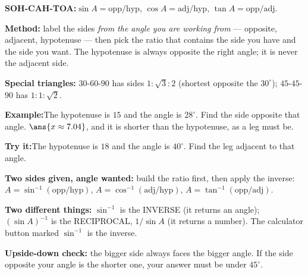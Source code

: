 \documentclass[12pt]{article}
\begin{document}


\begin{formulabox}
\textbf{SOH-CAH-TOA:}\quad $\sin A = \text{opp}/\text{hyp}$, \quad
$\cos A = \text{adj}/\text{hyp}$, \quad $\tan A = \text{opp}/\text{adj}$.\par
\smallskip
\textbf{Method:} label the sides \emph{from the angle you are working from} ---
opposite, adjacent, hypotenuse --- then pick the ratio that contains the side
you have and the side you want. The hypotenuse is always opposite the right
angle; it is never the adjacent side.\par
\smallskip
\textbf{Special triangles:} $30$-$60$-$90$ has sides $1 : \sqrt{3} : 2$
(shortest opposite the $30^\circ$); $45$-$45$-$90$ has $1 : 1 : \sqrt{2}$.
\end{formulabox}

\begin{examplebox}
\textbf{Example:}\quad The hypotenuse is $15$ and the angle is $28^\circ$. Find
the side opposite that angle.
$\ans{x \approx 7.04}$, and it is shorter than the hypotenuse, as a leg must be.
\end{examplebox}

\begin{tryitbox}
\textbf{Try it:}\quad The hypotenuse is $18$ and the angle is $40^\circ$. Find
the leg adjacent to that angle.\\[2pt]
\end{tryitbox}


\begin{formulabox}
\textbf{Two sides given, angle wanted:} build the ratio first, then apply the
inverse: $A = \sin^{-1}(\text{opp}/\text{hyp})$, \quad
$A = \cos^{-1}(\text{adj}/\text{hyp})$, \quad
$A = \tan^{-1}(\text{opp}/\text{adj})$.\par
\smallskip
\textbf{Two different things:} $\sin^{-1}$ is the INVERSE (it returns an angle);
$(\sin A)^{-1}$ is the RECIPROCAL, $1/\sin A$ (it returns a number). The
calculator button marked $\sin^{-1}$ is the inverse.\par
\smallskip
\textbf{Upside-down check:} the bigger side always faces the bigger angle. If
the side opposite your angle is the shorter one, your answer must be under
$45^\circ$.
\end{formulabox}
\end{document}
